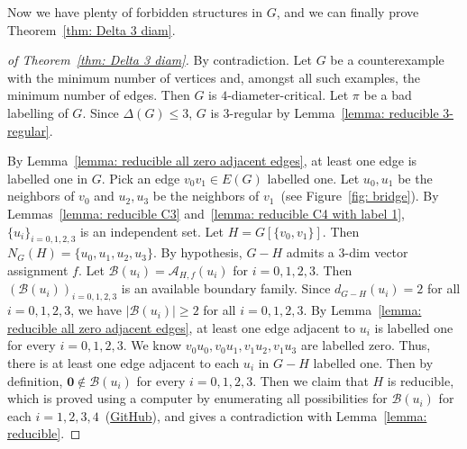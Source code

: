 \documentclass[
final
]{dmtcs-episciences}
\begin{document}
Now we have plenty of forbidden structures in $G$, and we can finally prove Theorem~\ref{thm: Delta 3 diam}.

\begin{proof}[of Theorem~\ref{thm: Delta 3 diam}] By contradiction.
    Let $G$ be a counterexample with the minimum number of vertices and, amongst all such examples, the minimum number of edges.
    Then $G$ is $4$-diameter-critical. 
    Let $\pi$ be a bad labelling of $G$.
    Since $\Delta(G)\le 3$, $G$ is 3-regular by Lemma~\ref{lemma: reducible 3-regular}.

     By Lemma~\ref{lemma: reducible all zero adjacent edges}, at least one edge is labelled one in $G$.
    Pick an edge $v_0v_1 \in E(G)$ labelled one.
    Let $u_0,u_1$ be the neighbors of $v_0$ and $u_2,u_3$ be the neighbors of $v_1$~(see Figure~\ref{fig: bridge}).
    By Lemmas~\ref{lemma: reducible C3} and~\ref{lemma: reducible C4 with label 1}, ${\{u_i\}}_{i=0,1,2,3}$ is an independent set.
    Let $H = G[\{v_0,v_1\}]$. Then $N_G(H) = \{u_0, u_1,u_2, u_3\}$. By hypothesis, $G-H$ admits a $3$-dim vector assignment $f$.
    Let $\mathcal{B}(u_i) = \mathcal{A}_{H,f}(u_i)$ for $i=0,1,2,3$. Then ${(\mathcal{B}(u_i))}_{i=0,1,2,3}$ is an available boundary family. 
    Since $d_{G-H}(u_i) = 2$ for all $i=0,1,2,3$, we have $|\mathcal{B}(u_i)| \ge 2$ for all $i=0,1,2,3$.
    By Lemma~\ref{lemma: reducible all zero adjacent edges}, at least one edge adjacent to $u_i$ is labelled one for every $i=0,1,2,3$.
    We know $v_0u_0, v_0u_1, v_1u_2, v_1u_3$ are labelled zero.
    Thus, there is at least one edge adjacent to each $u_i$ in $G-H$ labelled one.
    Then by definition, $\mathbf{0} \notin \mathcal{B}(u_i)$ for every $i=0,1,2,3$.
    Then we claim that $H$ is reducible, which is proved using a computer by enumerating all possibilities for $\mathcal{B}(u_i)$ for each $i=1,2,3,4$~(\href{https://github.com/handsome12138/InversionDiameter}{GitHub}), and gives a contradiction with Lemma~\ref{lemma: reducible}.
\end{proof}



\end{document}
